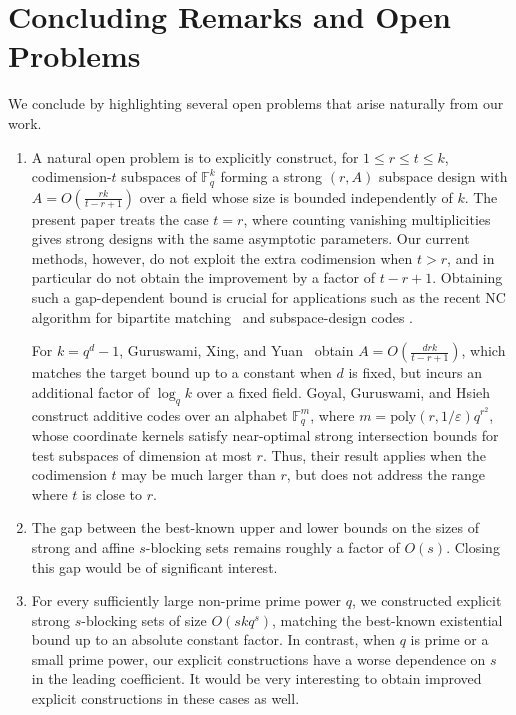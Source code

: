 \documentclass[11pt]{article}
\newcommand{\eps}{\varepsilon}
\newcommand{\F}{\mathbb{F}}
\newcommand{\poly}{\mathrm{poly}}
\begin{document}
\section{Concluding Remarks and Open Problems}

We conclude by highlighting several open problems that arise naturally from our work.

\begin{enumerate}
\item A natural open problem is to explicitly construct, for
$1\leq r\leq t\leq k$, codimension-$t$ subspaces of $\F_q^k$ forming a
strong $(r,A)$ subspace design with $A=O\left(\frac{rk}{t-r+1}\right)$
over a field whose size is bounded independently of $k$. The present paper treats the case $t=r$, where counting vanishing multiplicities gives strong designs with the same asymptotic parameters. Our current methods, however, do not exploit the extra codimension when $t>r$, and in particular do not obtain the improvement by a factor of $t-r+1$. Obtaining such a gap-dependent bound is crucial for applications such as the recent NC algorithm for bipartite matching~\cite{CGGRT26} and subspace-design codes \cite{chen2025explicit, Goyal2025OptimalPG, GGH26}.

For $k=q^d-1$, Guruswami, Xing, and Yuan~\cite{guruswami2018subspace} obtain $A=O\left(\frac{d r k}{t-r+1}\right)$,
which matches the target bound up to a constant when $d$ is fixed, but incurs an
additional factor of $\log_q k$ over a fixed field. Goyal, Guruswami, and Hsieh~\cite{GGH26} construct additive codes over an alphabet $\F_q^m$, where $m=\poly(r,1/\eps)q^{r^2}$,
whose coordinate kernels satisfy near-optimal strong intersection bounds for test subspaces of dimension at most $r$. Thus, their result applies when the codimension $t$ may be much larger than $r$, but does not address the range where $t$ is close to $r$.


\item The gap between the best-known upper and lower bounds on the sizes of strong and affine $s$-blocking sets remains roughly a factor of $O(s)$. Closing this gap would be of significant interest.

\item For every sufficiently large non-prime prime power $q$, we constructed explicit strong $s$-blocking sets of size $O(skq^s)$, matching the best-known existential bound up to an absolute constant factor. In contrast, when $q$ is prime or a small prime power, our explicit constructions have a worse dependence on $s$ in the leading coefficient. It would be very interesting to obtain improved explicit constructions in these cases as well.


\end{enumerate}
\end{document}
